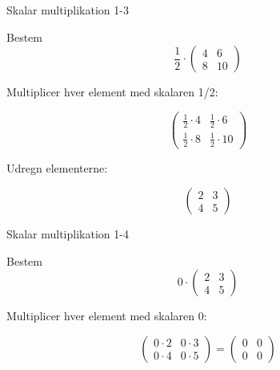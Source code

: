 \documentclass{article}
\begin{document}
\newpage

\begin{exercise}{Skalar multiplikation 1-3}

Bestem
\[
\frac{1}{2} \cdot \begin{pmatrix} 4 & 6 \\ 8 & 10 \end{pmatrix}
\]


\hint

Multiplicer hver element med skalaren 1/2:

\hint
\[
\begin{pmatrix} \frac{1}{2} \cdot 4 & \frac{1}{2} \cdot 6 \\ \frac{1}{2} \cdot 8 & \frac{1}{2} \cdot 10 \end{pmatrix}
\]

\hint

Udregn elementerne:

\hint
\[
\begin{pmatrix} 2 & 3 \\ 4 & 5 \end{pmatrix}
\]

\end{exercise}

\newpage

\begin{exercise}{Skalar multiplikation 1-4}

Bestem
\[
0 \cdot \begin{pmatrix} 2 & 3 \\ 4 & 5 \end{pmatrix}
\]


\hint

Multiplicer hver element med skalaren 0:

\hint
\[
\begin{pmatrix} 0 \cdot 2 & 0 \cdot 3 \\ 0 \cdot 4 & 0 \cdot 5 \end{pmatrix} = \begin{pmatrix} 0 & 0 \\ 0 & 0 \end{pmatrix}
\]

\end{exercise}
\end{document}
